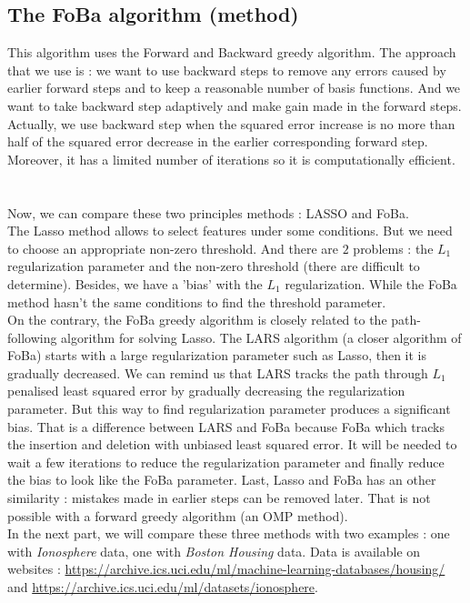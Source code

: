 \documentclass{article}
\begin{document}
\subsection{The FoBa algorithm (method)}
This algorithm uses the Forward and Backward greedy algorithm. The approach that we use is : we want to use backward steps to remove any errors caused by earlier forward steps and to keep a reasonable number of basis functions. And we want to take backward step adaptively and make gain made in the forward steps. Actually, we use backward step when the squared error increase is no more than half of the squared error decrease in the earlier corresponding forward step. Moreover, it has a limited number of iterations so it is computationally efficient. \\
\\
\\
Now, we can compare these two principles methods : LASSO and FoBa.\\
The Lasso method allows to select features under some conditions. But we need to choose an appropriate non-zero threshold. And there are $2$ problems : the $L_1$ regularization parameter and the non-zero threshold (there are difficult to determine). Besides, we have a 'bias' with the $L_1$ regularization. While the FoBa method hasn't the same conditions to find the threshold parameter.\\
On the contrary, the FoBa greedy algorithm is closely related to the path-following algorithm for solving Lasso. The LARS algorithm (a closer algorithm of FoBa) starts with a large regularization parameter such as Lasso, then it is gradually decreased. We can remind us that LARS tracks the path through $L_1$ penalised least squared error by gradually decreasing the regularization parameter. But this way to find regularization parameter produces a significant bias. That is a difference between LARS and FoBa because FoBa which tracks the insertion and deletion with unbiased least squared error. It will be needed to wait a few iterations to reduce the regularization parameter and finally reduce the bias to look like the FoBa parameter. Last, Lasso and FoBa has an other similarity : mistakes made in earlier steps can be removed later. That is not possible with a forward greedy algorithm (an OMP method).\\

In the next part, we will compare these three methods with two examples : one with \textit{Ionosphere} data, one with \textit{Boston Housing} data. Data is available on websites : \href{https://archive.ics.uci.edu/ml/machine-learning-databases/housing/}{https://archive.ics.uci.edu/ml/machine-learning-databases/housing/}\cite{data_bis} and \href{https://archive.ics.uci.edu/ml/datasets/ionosphere}{https://archive.ics.uci.edu/ml/datasets/ionosphere}\cite{data}. \\
\end{document}
